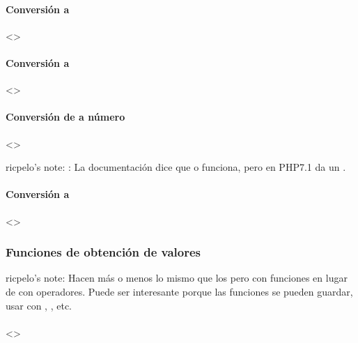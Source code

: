 \documentclass[a4paper,12pt,spanish]{sphinxmanual}
\begin{document}
\paragraph{Conversión a }
\label{\detokenize{php:conversion-a-int}}
\textless{}\textgreater{}


\paragraph{Conversión a }
\label{\detokenize{php:conversion-a-float}}
\textless{}\textgreater{}


\paragraph{Conversión de  a número}
\label{\detokenize{php:conversion-de-string-a-numero}}
\textless{}\textgreater{}

ricpelo’s note: : La documentación dice que 
o  funciona, pero en PHP7.1 da un .


\paragraph{Conversión a }
\label{\detokenize{php:conversion-a-string}}
\textless{}\textgreater{}


\subsubsection{Funciones de obtención de valores}
\label{\detokenize{php:funciones-de-obtencion-de-valores}}
ricpelo’s note: Hacen más o menos lo mismo que los  pero con
funciones en lugar de con operadores. Puede ser interesante porque las
funciones se pueden guardar, usar con , , etc.


\paragraph{}
\label{\detokenize{php:intval}}
\textless{}\textgreater{}
\end{document}
